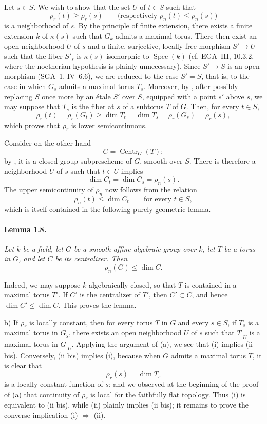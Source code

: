 Let \(s\in S\). We wish to show that the set \(U\) of \(t\in S\) such
that
\[
  \rho_r(t)\geq \rho_r(s)
  \qquad
  \bigl(\text{respectively }\rho_n(t)\leq \rho_n(s)\bigr)
\]
is a neighborhood of \(s\). By the principle of finite extension,
there exists a finite extension \(k\) of \(\kappa(s)\) such that
\(G_k\) admits a maximal torus. There then exist an open neighborhood
\(U\) of \(s\) and a finite, surjective, locally free morphism
\(S'\to U\) such that the fiber \(S'_s\) is
\(\kappa(s)\)-isomorphic to \(\operatorname{Spec}(k)\) (cf. EGA~III,
10.3.2, where the noetherian hypothesis is plainly unnecessary).
Since \(S'\to S\) is an open morphism (SGA~1, IV~6.6), we are reduced
to the case \(S'=S\), that is, to the case in which \(G_s\) admits a
maximal torus \(T_s\). Moreover, by , after possibly replacing
\(S\) once more by an étale \(S'\) over \(S\), equipped with a point
\(s'\) above \(s\), we may suppose that \(T_s\) is the fiber at \(s\)
of a subtorus \(T\) of \(G\). Then, for every \(t\in S\),
\[
  \rho_r(t)=\rho_r(G_t)
  \geq \dim T_t
  =\dim T_s
  =\rho_r(G_s)
  =\rho_r(s),
\]
which proves that \(\rho_r\) is lower semicontinuous.

Consider on the other hand
\[
  C=\operatorname{Centr}_G(T);
\]
by , it is a closed group subprescheme of \(G\), smooth
over \(S\). There is
therefore a neighborhood \(U\) of \(s\) such that \(t\in U\) implies
\[
  \dim C_t=\dim C_s=\rho_n(s).
\]
The upper semicontinuity of \(\rho_n\) now follows from the relation
\[
  \rho_n(t)\leq \dim C_t
  \qquad\text{for every }t\in S,
\]
which is itself contained in the following purely geometric lemma.

\paragraph{\textbf{Lemma 1.8.}}
\emph{Let \(k\) be a field, let \(G\) be a smooth affine algebraic
group over \(k\), let \(T\) be a torus in \(G\), and let \(C\) be its
centralizer. Then}
\[
  \rho_n(G)\leq \dim C.
\]

Indeed, we may suppose \(k\) algebraically closed, so that \(T\) is
contained in a maximal torus \(T'\). If \(C'\) is the centralizer of
\(T'\), then \(C'\subset C\), and hence
\(\dim C'\leq \dim C\). This proves the lemma.

b) If \(\rho_r\) is locally constant, then for every torus \(T\) in
\(G\) and every \(s\in S\), if \(T_s\) is a maximal torus in \(G_s\),
there exists an open neighborhood \(U\) of \(s\) such that
\(T|_U\) is a maximal torus in \(G|_U\). Applying the argument of (a),
we see that (i) implies (ii bis). Conversely, (ii bis) implies (i),
because when \(G\) admits a maximal torus \(T\), it is clear that
\[
  \rho_r(s)=\dim T_s
\]
is a locally constant function of \(s\); and we observed at the
beginning of the proof of (a) that continuity of \(\rho_r\) is local
for the faithfully flat topology. Thus (i) is equivalent to
(ii bis), while (ii) plainly implies (ii bis); it remains to prove
the converse implication (i) \(\Rightarrow\) (ii).

